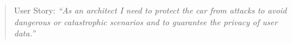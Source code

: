 \begin{itemize}
\begin{itemize}
\begin{quote}
{User Story:} 
\emph{``As an architect I need to protect the car from attacks to avoid dangerous or catastrophic scenarios and to guarantee the privacy of user data.''}
\end{quote}


\end{itemize}


%
%
%

\end{itemize}
